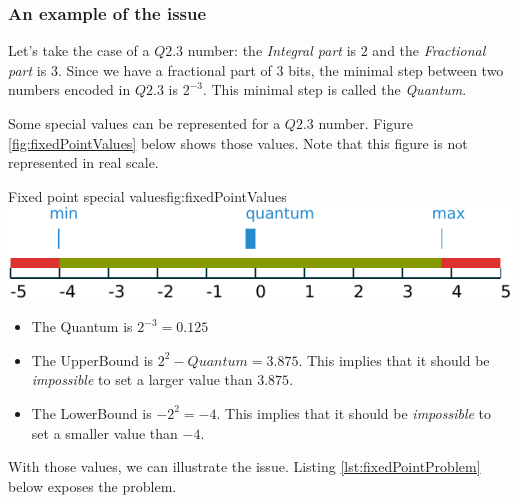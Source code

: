 \subsubsection{An example of the issue}

Let's take the case of a $Q2.3$ number: the \emph{Integral part} is $2$ and the
\emph{Fractional part} is $3$.
Since we have a fractional part of $3$ bits, the minimal step between two numbers encoded in $Q2.3$ is
$2^{-3}$. This minimal step is called the \emph{Quantum}.

Some special values can be represented for a $Q2.3$ number. Figure \ref{fig:fixedPointValues} below shows those values. Note that
this figure is not represented in real scale.
\begin{figureGraphics}{Fixed point special values}{fig:fixedPointValues}
    \includegraphics[width=\textwidth]{./src/img/fixedPoint.pdf}
\end{figureGraphics}

\begin{itemize}
    \item The Quantum is $2^{-3} = 0.125$
    \item The UpperBound is $2^2 - Quantum = 3.875$.
        This implies that it should be \emph{impossible} to set a larger value than $3.875$.
    \item The LowerBound is $-2^2 = -4$.
        This implies that it should be \emph{impossible} to set a smaller value than $-4$.
\end{itemize}

With those values, we can illustrate the issue.
Listing \ref {lst:fixedPointProblem} below exposes the problem.



